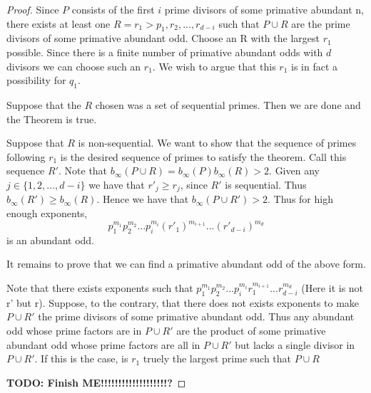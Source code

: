 \documentclass[../paper.tex]{subfiles}
\begin{document}
\begin{proof}
	Since $P$ consists of the first $i$ prime divisors of some 
primative abundant n, there exists at least one
$R = {r_1 > p_1, r_2, ..., r_{d-i}}$ such that $P \cup R$ are the 
prime divisors of some primative abundant odd. Choose an R with the
largest $r_1$ possible. Since there is a finite number of 
primative abundant odds with $d$ divisors we can choose such an
$r_1$. We wish to argue that this $r_1$ is in fact a possibility
for $q_1$.

	Suppose that the $R$ chosen was a set of sequential primes. 
Then we are done and the Theorem is true.

	Suppose that $R$ is non-sequential. We want to show that the 
sequence of primes following $r_1$ is the desired sequence of 
primes to satisfy the theorem. Call this sequence $R'$. Note that
$b_{\infty}(P \cup R) = b_{\infty}(P) b_{\infty}(R) > 2$. Given 
any $j \in \{1, 2, ..., d-i\}$ we have that $r'_j \geq r_j$, since
$R'$ is sequential. Thus $b_{\infty}(R') \geq b_{\infty}(R)$. Hence
we have that $b_{\infty}(P \cup R') > 2$. Thus for high enough 
exponents, 
%
$$p_1^{m_1}  p_2^{m_2} ... p_i^{m_i} (r'_1)^{m_{i+1}} ... (r'_{d-i})^{m_d}$$
%
is an abundant odd.

	It remains to prove that we can find a primative abundant odd 
of the above form.

	Note that there exists exponents such that 
%
$p_1^{m_1}  p_2^{m_2} ... p_i^{m_i} r_1^{m_{i+1}} ... r_{d-i}^{m_d}$
%
(Here it is not r' but r). Suppose, to the contrary, that there 
does not exists exponents to make $P \cup R'$ the prime divisors 
of some primative abundant odd. Thus any abundant odd whose prime
factors are in $P \cup R'$ are the product of some primative 
abundant odd whose prime factors are all in $P \cup R'$ but lacks
a single divisor in $P \cup R'$. If this is the case, is $r_1$ truely
the largest prime such that $P \cup R$

\textbf{TODO: Finish ME!!!!!!!!!!!!!!!!!!!?}

\end{proof}


 



% 
\end{document}
